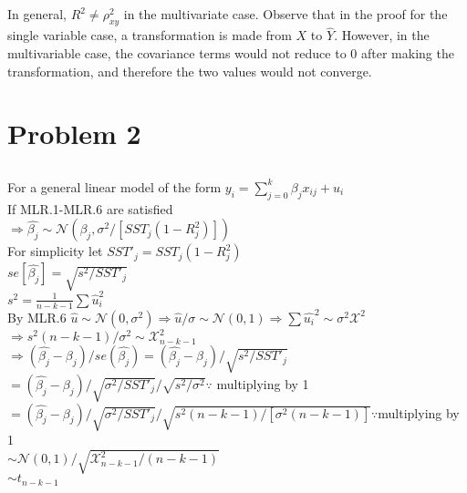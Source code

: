 \documentclass[11pt, oneside]{article}   	%
\begin{document}
\subsection{}
In general, $R^2\neq\rho_{xy}^2$ in the multivariate case. Observe that in the proof for the single variable case, a transformation is made from $X$ to $\hat{Y}$. However, in the multivariable case, the covariance terms would not reduce to 0 after making the transformation, and therefore the two values would not converge.\\

\section{Problem 2}
\subsection{}
For a general linear model of the form $y_i=\sum_{j=0}^k\beta_j x_{ij} +u_i$\\
If MLR.1-MLR.6 are satisfied\\
\indent $\Rightarrow \hat{\beta_j}\sim \mathcal{N}(\beta_j, \sigma^2/[SST_j(1-R_j^2)])$\\
\indent For simplicity let $SST'_j=SST_j(1-R_j^2)$\\
\indent\indent $se[\hat{\beta_j}]=\sqrt{s^2/SST'_j}$\\
\indent\indent $s^2=\frac{1}{n-k-1}\sum \hat{u}_i^2$\\
\indent By MLR.6 $\hat{u}\sim\mathcal{N}(0,\sigma^2)\Rightarrow \hat{u}/\sigma\sim\mathcal{N}(0,1)\Rightarrow \sum \hat{u_i}^2\sim\sigma^2\mathcal{X}^2$\\
\indent$\Rightarrow s^2(n-k-1)/\sigma^2\sim\mathcal{X}^2_{n-k-1}$\\
$\Rightarrow(\hat{\beta_j}-\beta_j)/se(\hat{\beta_j})=(\hat{\beta_j}-\beta_j)/\sqrt{s^2/SST'_j}$\\
\indent$=(\hat{\beta_j}-\beta_j)/\sqrt{\sigma^2/SST'_j}/\sqrt{s^2/\sigma^2}$\hfill$\because$ multiplying by 1\\
\indent$=(\hat{\beta_j}-\beta_j)/\sqrt{\sigma^2/SST'_j}/\sqrt{s^2(n-k-1)/[\sigma^2(n-k-1)]}$\hfill$\because$multiplying by 1\\
\indent$\sim\mathcal{N}(0,1)/\sqrt{\mathcal{X}^2_{n-k-1}/(n-k-1)}$\\
\indent$\sim t_{n-k-1}$\\


\end{document}
